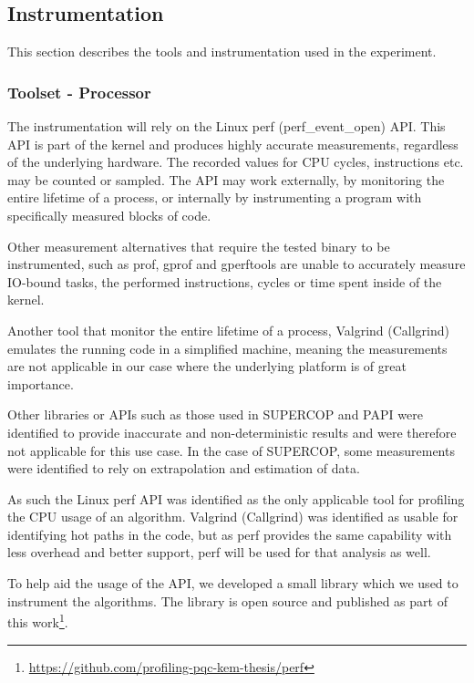 \subsection{Instrumentation}

This section describes the tools and instrumentation used in the experiment.

\subsubsection{Toolset - Processor}
The instrumentation will rely on the Linux perf (perf\_event\_open) API. This API is part of the kernel and produces highly accurate measurements, regardless of the underlying hardware. The recorded values for CPU cycles, instructions etc. may be counted or sampled. The API may work externally, by monitoring the entire lifetime of a process, or internally by instrumenting a program with specifically measured blocks of code.

Other measurement alternatives that require the tested binary to be instrumented, such as prof, gprof and gperftools are unable to accurately measure IO-bound tasks, the performed instructions, cycles or time spent inside of the kernel.

Another tool that monitor the entire lifetime of a process, Valgrind (Callgrind) emulates the running code in a simplified machine, meaning the measurements are not applicable in our case where the underlying platform is of great importance.

Other libraries or APIs such as those used in SUPERCOP and PAPI were identified to provide inaccurate and non-deterministic results and were therefore not applicable for this use case. In the case of SUPERCOP, some measurements were identified to rely on extrapolation and estimation of data.

As such the Linux perf API was identified as the only applicable tool for profiling the CPU usage of an algorithm. Valgrind (Callgrind) was identified as usable for identifying hot paths in the code, but as perf provides the same capability with less overhead and better support, perf will be used for that analysis as well.

To help aid the usage of the API, we developed a small library which we used to instrument the algorithms. The library is open source and published as part of this work\footnote{\href{https://github.com/profiling-pqc-kem-thesis/perf}{https://github.com/profiling-pqc-kem-thesis/perf}}.


